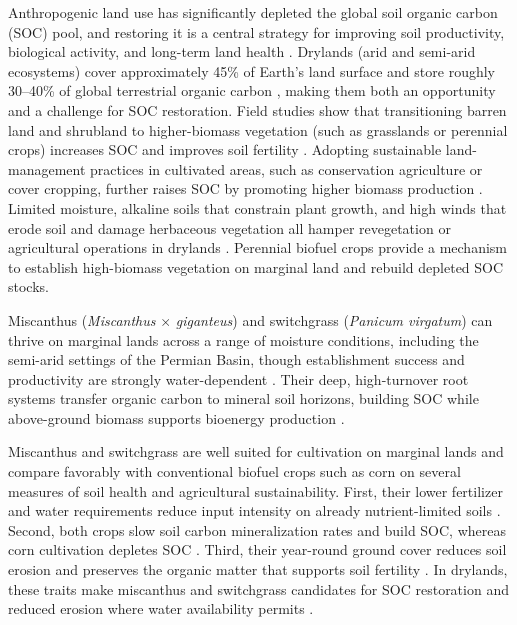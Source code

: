 \documentclass[11pt]{article}
\begin{document}
Anthropogenic land use has significantly depleted the global soil organic carbon (SOC) pool, and restoring it is a central strategy for improving soil productivity, biological activity, and long-term land health \citep{Lal2001SoilSequestration,Lal2004bClimateChange,Sanderman2017SoilCarbonDebt,Scharlemann2014GlobalSoilCarbon}. Drylands (arid and semi-arid ecosystems) cover approximately 45\% of Earth's land surface and store roughly 30--40\% of global terrestrial organic carbon \citep{Lal2004aDrylandEcosystems,Schimel2010Drylands}, making them both an opportunity and a challenge for SOC restoration. Field studies show that transitioning barren land and shrubland to higher-biomass vegetation (such as grasslands or perennial crops) increases SOC and improves soil fertility \citep{Arije2024SOCRecovery}. Adopting sustainable land-management practices in cultivated areas, such as conservation agriculture or cover cropping, further raises SOC by promoting higher biomass production \citep{Farage2007Placeholder,Joshi2023Placeholder,Moukanni2022Placeholder}. Limited moisture, alkaline soils that constrain plant growth, and high winds that erode soil and damage herbaceous vegetation all hamper revegetation or agricultural operations in drylands \citep{DOdorico2012Placeholder,Naorem2023Placeholder}. Perennial biofuel crops provide a mechanism to establish high-biomass vegetation on marginal land and rebuild depleted SOC stocks.

Miscanthus (\textit{Miscanthus} $\times$ \textit{giganteus}) and switchgrass (\textit{Panicum virgatum}) can thrive on marginal lands across a range of moisture conditions, including the semi-arid settings of the Permian Basin, though establishment success and productivity are strongly water-dependent \citep{VanDerWeijde2017Drought,Zeri2013WUE}. Their deep, high-turnover root systems transfer organic carbon to mineral soil horizons, building SOC while above-ground biomass supports bioenergy production \citep{Gelfand2013MarginalLands,AndersonTeixeira2009SOC,Johnson2007BiomassCropping,Martani2021Placeholder}.

Miscanthus and switchgrass are well suited for cultivation on marginal lands and compare favorably with conventional biofuel crops such as corn on several measures of soil health and agricultural sustainability. First, their lower fertilizer and water requirements reduce input intensity on already nutrient-limited soils \citep{Davis2010Comparative,Zeri2013WUE}. Second, both crops slow soil carbon mineralization rates and build SOC, whereas corn cultivation depletes SOC \citep{AndersonTeixeira2009SOC,Ferrarini2022Placeholder}. Third, their year-round ground cover reduces soil erosion and preserves the organic matter that supports soil fertility \citep{Smeets2009Performance,BlancoCanqui2016Placeholder}. In drylands, these traits make miscanthus and switchgrass candidates for SOC restoration and reduced erosion where water availability permits \citep{Zeri2013WUE,VanLoocke2012WUE}.
\end{document}
